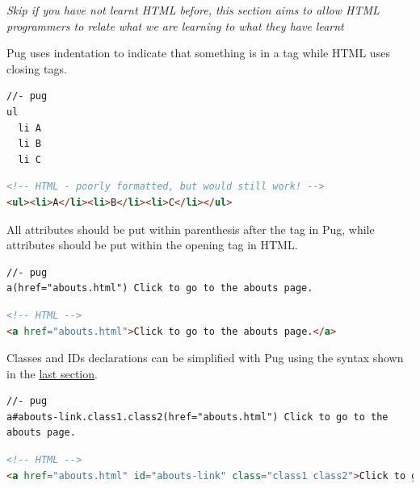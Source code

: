 \textit{Skip if you have not learnt HTML before, this section aims to allow HTML programmers to relate what we are learning to what they have learnt}
\vspace{6mm}

Pug uses indentation to indicate that something is in a tag while HTML uses closing tags.
\vspace{6mm}

\begin{lstlisting}[language=pug]
//- pug
ul
  li A
  li B
  li C
\end{lstlisting}

\begin{lstlisting}[language=html]
<!-- HTML - poorly formatted, but would still work! -->
<ul><li>A</li><li>B</li><li>C</li></ul>
\end{lstlisting}

All attributes should be put within parenthesis after the tag in Pug, while attributes should be put within the opening tag in HTML.
\vspace{6mm}

\begin{lstlisting}[language=pug]
//- pug
a(href="abouts.html") Click to go to the abouts page.
\end{lstlisting}

\begin{lstlisting}[language=html]
<!-- HTML -->
<a href="abouts.html">Click to go to the abouts page.</a>
\end{lstlisting}

Classes and IDs declarations can be simplified with Pug using the syntax shown in the \hyperref[sec:classesids]{last section}.
\vspace{6mm}

\begin{lstlisting}[language=pug]
//- pug
a#abouts-link.class1.class2(href="abouts.html") Click to go to the abouts page.
\end{lstlisting}

\begin{lstlisting}[language=html]
<!-- HTML -->
<a href="abouts.html" id="abouts-link" class="class1 class2">Click to go to the abouts page.</a>
\end{lstlisting}

